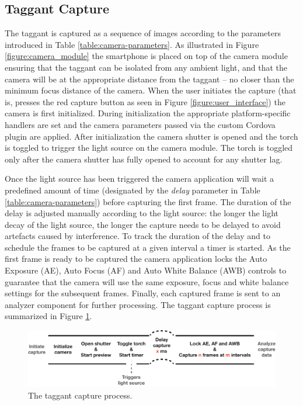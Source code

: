 \documentclass[thesis.tex]{subfiles}
\begin{document}
\subsection{Taggant Capture}

The taggant is captured as a sequence of images according to the parameters introduced in Table \ref{table:camera-parameters}. As illustrated in Figure \ref{figure:camera_module} the smartphone is placed on top of the camera module ensuring that the taggant can be isolated from any ambient light, and that the camera will be at the appropriate distance from the taggant -- no closer than the minimum focus distance of the camera. When the user initiates the capture (that is, presses the red capture button as seen in Figure \ref{figure:user_interface}) the camera is first initialized. During initialization the appropriate platform-specific handlers are set and the camera parameters passed via the custom Cordova plugin are applied. After initialization the camera shutter is opened and the torch is toggled to trigger the light source on the camera module. The torch is toggled only after the camera shutter has fully opened to account for any shutter lag.

Once the light source has been triggered the camera application will wait a predefined amount of time (designated by the \emph{delay} parameter in Table \ref{table:camera-parameters}) before capturing the first frame. The duration of the delay is adjusted manually according to the light source: the longer the light decay of the light source, the longer the capture needs to be delayed to avoid artefacts caused by interference. To track the duration of the delay and to schedule the frames to be captured at a given interval a timer is started. As the first frame is ready to be captured the camera application locks the Auto Exposure (AE), Auto Focus (AF) and Auto White Balance (AWB) controls to guarantee that the camera will use the same exposure, focus and white balance settings for the subsequent frames. Finally, each captured frame is sent to an analyzer component for further processing. The taggant capture process is summarized in Figure \ref{figure:taggant-capture-process}.

\begin{figure}[h]
\centering \includegraphics[width=\textwidth,height=\textheight,keepaspectratio=true]{images/design_implementation/capture_process.pdf}
\caption{The taggant capture process. \label{figure:taggant-capture-process}}
\end{figure}
\end{document}
